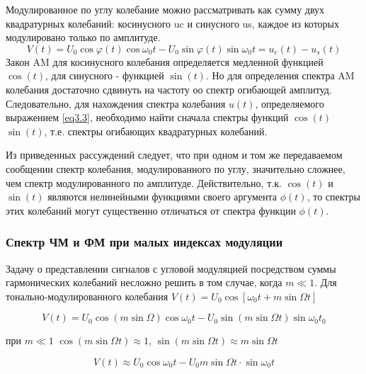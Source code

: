  Модулированное по углу колебание можно рассматривать как сумму двух квадратурных колебаний: косинусного uc и синусного us, каждое из которых модулировано только по амплитуде. 
\begin{equation}
\label{eq3.3}
	V(t)=U_{0} \cos \varphi(t) \cos \omega_{0} t-U_{0} \sin \varphi(t) \sin \omega_{0} t=u_{c}(t)-u_{s}(t)
\end{equation}
 Закон AM для косинусного колебания определяется медленной функцией $\cos(t)$, для синусного - функцией $\sin(t)$. Но для определения спектра AM колебания достаточно сдвинуть на частоту оо спектр огибающей амплитуд. Следовательно, для нахождения спектра колебания $u(t)$, определяемого выражением \eqref{eq3.3}, необходимо найти сначала спектры функций $\cos(t)$ $\sin(t)$, т.е. спектры огибающих квадратурных колебаний.

Из приведенных рассуждений следует, что при одном и том же передаваемом сообщении спектр колебания, модулированного по углу, значительно сложнее, чем спектр модулированного по амплитуде. Действительно, т.к. $\cos(t)$ и $\sin(t)$ являются нелинейными функциями своего аргумента $\phi(t)$, то спектры этих колебаний могут существенно отличаться от спектра функции $\phi(t)$.


\subsubsection{Спектр ЧМ и ФМ при малых индексах модуляции} %
	
Задачу о представлении сигналов с угловой модуляцией посредством суммы гармонических колебаний несложно решить в том случае, когда $m\ll 1$. Для тонально-модулированного колебания $V(t)=U_{0} \cos \left[\omega_{0} t+m\sin \Omega t\right]$

\begin{equation}
	V(t)=U_{0} \cos (m \sin \Omega) \cos \omega_{0} t-U_{0} \sin (m \sin \Omega t) \sin \omega_{0} t_{0}
\end{equation}

при $m\ll 1$ $\cos (m \sin \Omega t) \approx 1$, $\sin (m \sin \Omega t) \approx m \sin \Omega t$

\begin{equation}
	V(t) \approx U_{0} \cos \omega_{0} t-U_{0} m \sin \Omega t \cdot \sin \omega_{0} t
\end{equation}

